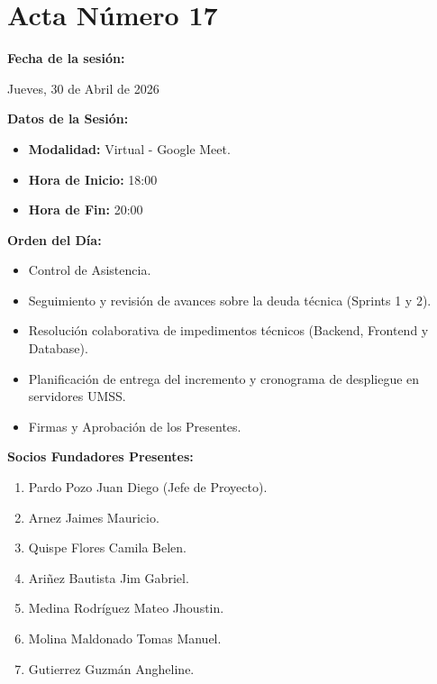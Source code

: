 \newpage
\section{Acta Número 17}
\label{sec:acta17}

\noindent \textbf{Fecha de la sesión:}\par
Jueves, 30 de Abril de 2026

\vspace*{0.5cm}
\noindent \textbf{Datos de la Sesión:}
\vspace{-0.2cm}
\begin{itemize}[noitemsep]
    \item \textbf{Modalidad:} Virtual - Google Meet.
    \item \textbf{Hora de Inicio:} 18:00
    \item \textbf{Hora de Fin:} 20:00
\end{itemize}

\vspace*{0.5cm}
\noindent \textbf{Orden del Día:}
\vspace{-0.2cm}
\begin{itemize}[noitemsep]
    \item Control de Asistencia.
    \item Seguimiento y revisión de avances sobre la deuda técnica (Sprints 1 y 2).
    \item Resolución colaborativa de impedimentos técnicos (Backend, Frontend y Database).
    \item Planificación de entrega del incremento y cronograma de despliegue en servidores UMSS.
    \item Firmas y Aprobación de los Presentes.
\end{itemize}

\vspace*{0.5cm}
\noindent \textbf{Socios Fundadores Presentes:}
\vspace{-0.2cm}
\begin{enumerate}[noitemsep]
    \item Pardo Pozo Juan Diego (Jefe de Proyecto).
    \item Arnez Jaimes Mauricio.
    \item Quispe Flores Camila Belen.
    \item Ariñez Bautista Jim Gabriel.
    \item Medina Rodríguez Mateo Jhoustin.
    \item Molina Maldonado Tomas Manuel.
    \item Gutierrez Guzmán Angheline.
\end{enumerate}

